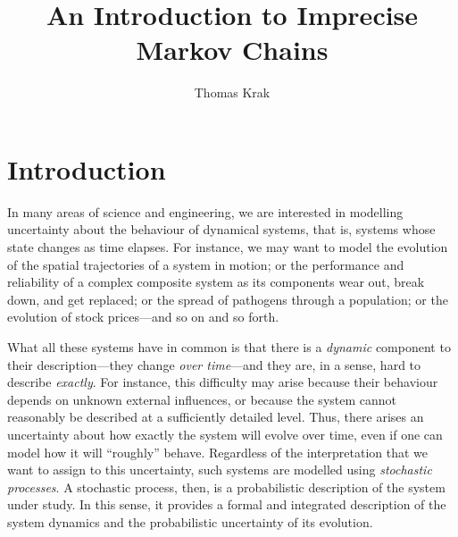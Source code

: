 \documentclass[graybox]{svmult}
\begin{document}

\title{An Introduction to Imprecise Markov Chains}
\author{Thomas Krak}
%
%
\maketitle



\section{Introduction}

In many areas of science and engineering, we are interested in modelling uncertainty about the behaviour of dynamical systems, that is, systems whose state changes as time elapses. For instance, we may want to model the evolution of the spatial trajectories of a system in motion; or the performance and reliability of a complex composite system as its components wear out, break down, and get replaced; or the spread of pathogens through a population; or the evolution of stock prices---and so on and so forth. 

What all these systems have in common is that there is a \emph{dynamic} component to their description---they change \emph{over time}---and they are, in a sense, hard to describe \emph{exactly}. For instance, this difficulty may arise because their behaviour depends on unknown external influences, or because the system cannot reasonably be described at a sufficiently detailed level. Thus, there arises an uncertainty about how exactly the system will evolve over time, even if one can model how it will ``roughly'' behave.
Regardless of the interpretation that we want to assign to this uncertainty, such systems are modelled using \emph{stochastic processes}. A stochastic process, then, is a probabilistic description of the system under study. In this sense, it provides a formal and integrated description of the system dynamics and the probabilistic uncertainty of its evolution.
\end{document}
